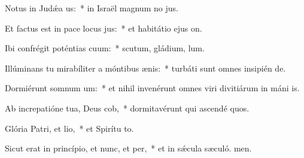 \item Notus in Judǽa us:~* in Israël magnum no jus.
\item Et factus est in pace locus jus:~* et habitátio ejus  on.
\item Ibi confrégit poténtias cuum:~* scutum, gládium,  lum.
\item Illúminans tu mirabíliter a móntibus ænis:~* turbáti sunt omnes insipién de.
\item Dormiérunt somnum um:~* et nihil invenérunt omnes viri divitiárum in máni is.
\item Ab increpatióne tua, Deus cob,~* dormitavérunt qui ascendé quos.
\item Glória Patri, et lio,~* et Spirítu to.
\item Sicut erat in princípio, et nunc, et per,~* et in sǽcula sæculó. men.
